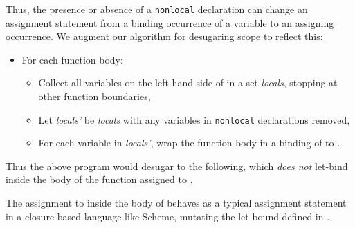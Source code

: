 \documentclass[10pt]{sigplanconf}
\newcommand{\Scribtexttt}[1]{{\texttt{#1}}}
\newlength{\stabLeft}
\newcommand{\atItemizeStart}[0]{\addtolength{\stabLeft}{\labelsep}
                                \addtolength{\stabLeft}{\labelwidth}}
\newenvironment{SCentered}{\begin{trivlist}\item \centering}{\end{trivlist}}
\begin{document}
Thus, the presence or absence of a \Scribtexttt{nonlocal} declaration can change an
assignment statement from a binding occurrence of a variable to an assigning
occurrence.  We augment our algorithm for desugaring scope to reflect this:


\noindent \begin{itemize}\atItemizeStart

\item For each function body:

\begin{itemize}\atItemizeStart

\item Collect all variables on the left{-}hand side of  in a set \textit{locals}, stopping at other function boundaries,

\item Let \textit{locals{'}} be \textit{locals} with any variables in
\Scribtexttt{nonlocal} declarations removed,

\item For each variable  in \textit{locals{'}}, wrap the
function body in a binding of  to .\end{itemize}\end{itemize}

\noindent Thus the above program would desugar to the following, which \textit{does not}
let{-}bind  inside the body of the function assigned to .


\noindent \begin{SCentered}\end{SCentered}

\noindent The assignment to  inside the body of  behaves as a
typical assignment statement in a closure{-}based language like Scheme, mutating
the let{-}bound  defined in .
\end{document}
